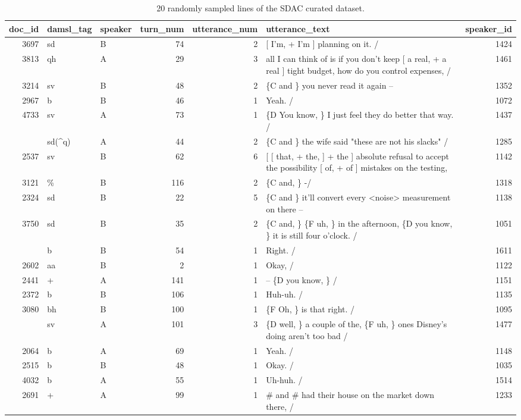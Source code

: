\documentclass[
  letterpaper,
]{latex/krantz}
\begin{document}
\hypertarget{tbl-td-sdac-preview-curated-dataset}{}
\begin{table}
\caption{\label{tbl-td-sdac-preview-curated-dataset}20 randomly sampled lines of the SDAC curated dataset. }\tabularnewline

\centering
\begin{tabular}{rllrrlr}
\toprule
doc\_id & damsl\_tag & speaker & turn\_num & utterance\_num & utterance\_text & speaker\_id\\
\midrule
3697 & sd & B & 74 & 2 & {}[ I'm, + I'm ] planning on it.  / & 1424\\
3813 & qh & A & 29 & 3 & all I can think of is if you don't keep [ a real, + a real ] tight budget, how do you control expenses,  / & 1461\\
3214 & sv & B & 48 & 2 & \{C and \} you never read it again -- & 1352\\
2967 & b & B & 46 & 1 & Yeah.  / & 1072\\
4733 & sv & A & 73 & 1 & \{D You know, \} I just feel they do better that way. / & 1437\\
\addlinespace
3052 & sd(\textasciicircum{}q) & A & 44 & 2 & \{C and \} the wife said "these are not  his slacks"  / & 1285\\
2537 & sv & B & 62 & 6 & {}[ [ that, +  the, ] +  the ] absolute refusal to accept the possibility [ of, +  of ] mistakes on the testing, & 1142\\
3121 & \% & B & 116 & 2 & \{C and, \} -/ & 1318\\
2324 & sd & B & 22 & 5 & \{C and \} it'll convert every <noise> measurement on there -- & 1138\\
3750 & sd & B & 35 & 2 & \{C and, \} \{F uh, \}  in the afternoon, \{D you know, \} it is still four o'clock.  / & 1051\\
\addlinespace
4723 & b & B & 54 & 1 & Right. / & 1611\\
2602 & aa & B & 2 & 1 & Okay,  / & 1122\\
2441 & + & A & 141 & 1 & -- \{D you know, \}  / & 1151\\
2372 & b & B & 106 & 1 & Huh-uh. / & 1135\\
3080 & bh & B & 100 & 1 & \{F Oh, \} is that right. / & 1095\\
\addlinespace
3777 & sv & A & 101 & 3 & \{D well, \} a couple of the, \{F uh, \} ones Disney's doing aren't too bad  / & 1477\\
2064 & b & A & 69 & 1 & Yeah. / & 1148\\
2515 & b & B & 48 & 1 & Okay. / & 1035\\
4032 & b & A & 55 & 1 & Uh-huh. / & 1514\\
2691 & + & A & 99 & 1 & \# and \# had their house on the market down there,  / & 1233\\
\bottomrule
\end{tabular}
\end{table}
\end{document}
